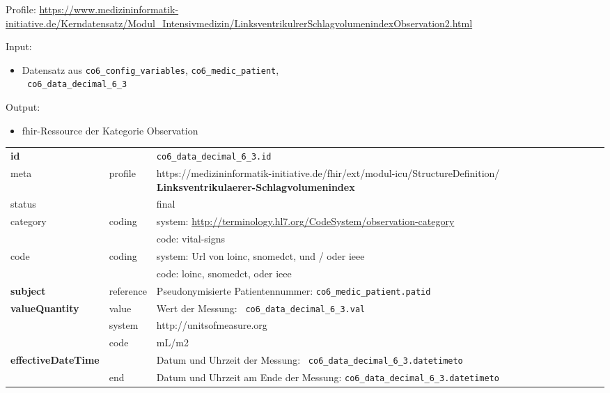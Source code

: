 \noindent Profile: \url{https://www.medizininformatik-initiative.de/Kerndatensatz/Modul_Intensivmedizin/LinksventrikulrerSchlagvolumenindexObservation2.html}

\noindent Input:
\begin{itemize}
	\item Datensatz aus \texttt{co6\_config\_variables}, \texttt{co6\_medic\_patient}, \\ \texttt{
co6\_data\_decimal\_6\_3}
\end{itemize}
Output:
\begin{itemize}
        \item \ac{fhir}-Ressource der Kategorie \glqq Observation\grqq{}
\end{itemize}
\begin{longtable}{|l|l|p{7.5cm}|}
        \hline
        \rowcolor{lightgray} \multicolumn{3}{|l|}{Data Mapping (inhaltlich)} \\ \hline
        \textbf{id} &  & \texttt{co6\_data\_decimal\_6\_3.id} \\ \hline
	meta & profile & https://medizininformatik-initiative.de/fhir/ext/modul-icu/StructureDefinition/\textbf{
Linksventrikulaerer-Schlagvolumenindex} \\ \hline 
	status &  & final   \\ \hline 
	category & coding & system: \url{http://terminology.hl7.org/CodeSystem/observation-category} \\
\cline{3-3}
	& & code: vital-signs \\ \hline
	code & coding & system: Url von \ac{loinc}, \ac{snomedct}, und / oder \ac{ieee} \\ 
	\cline{3-3} 
	 &  & code: \ac{loinc}, \ac{snomedct}, oder \ac{ieee} \\ \hline
	 \textbf{subject}  & reference & Pseudonymisierte Patientennummer: \texttt{co6\_medic\_patient.patid} \\ \hline
	 \textbf{valueQuantity}  & value & Wert der Messung: \texttt{
co6\_data\_decimal\_6\_3.val} \\
        \cline{2-3}
         & system & http://unitsofmeasure.org \\
         \cline{2-3}
         & code & mL/m2 \\ \hline
     \textbf{effectiveDateTime}  & & Datum und Uhrzeit der Messung: \texttt{
co6\_data\_decimal\_6\_3.datetimeto} \\
    \cline{2-3}
     & end & Datum und Uhrzeit am Ende der Messung: \texttt{co6\_data\_decimal\_6\_3.datetimeto} \\ \hline
\end{longtable}


